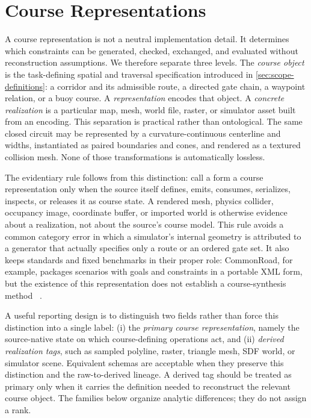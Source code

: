 \section{Course Representations}
\label{sec:representations}

A course representation is not a neutral implementation detail. It determines which
constraints can be generated, checked, exchanged, and evaluated without reconstruction
assumptions. We therefore separate three levels. The \emph{course object} is the
task-defining spatial and traversal specification introduced in
\cref{sec:scope-definitions}: a corridor and its admissible route, a directed gate
chain, a waypoint relation, or a buoy course. A \emph{representation} encodes that
object. A \emph{concrete realization} is a particular map, mesh, world file, raster,
or simulator asset built from an encoding. This separation is practical rather than
ontological. The same closed circuit may be represented by a curvature-continuous
centerline and widths, instantiated as paired boundaries and cones, and rendered as
a textured collision mesh. None of those transformations is automatically lossless.

The evidentiary rule follows from this distinction: call a form a course
representation only when the source itself defines, emits, consumes, serializes,
inspects, or releases it as course state. A rendered mesh, physics collider,
occupancy image, coordinate buffer, or imported world is otherwise evidence about a
realization, not about the source's course model. This rule avoids a common category
error in which a simulator's internal geometry is attributed to a generator that
actually specifies only a route or an ordered gate set. It also keeps standards and
fixed benchmarks in their proper role: CommonRoad, for example, packages scenarios
with goals and constraints in a portable XML form, but the existence of this
representation does not establish a course-synthesis method
~\cite{Althoff2017CommonRoadComposable}.

A useful reporting design is to distinguish two fields rather than force this
distinction into a single label: (i) the \emph{primary course representation}, namely
the source-native state on which course-defining operations act, and (ii) \emph{derived
realization tags}, such as sampled polyline, raster, triangle mesh, SDF world, or
simulator scene. Equivalent schemas are acceptable when they preserve this distinction
and the raw-to-derived lineage. A derived tag should be treated as primary only when it
carries the definition needed to reconstruct the relevant course object. The families
below organize analytic differences; they do not assign a rank.

